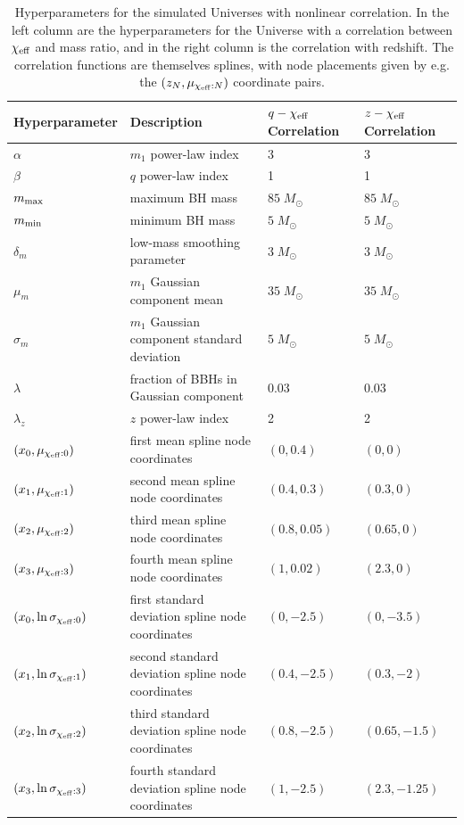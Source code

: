 \documentclass[%
 reprint,
 amsmath,amssymb,
 aps,
 prd,
]{revtex4-2}
\newcommand{\chieff}{\chi_{\rm eff}}
\newcommand{\Msun}{\;M_\odot}
\begin{document}
\renewcommand{\arraystretch}{1.25}
\begin{table}
    \centering
    \begin{tabular}{|l||lll|}
       \hline Hyperparameter & Description & $q-\chieff$ Correlation & $z-\chieff$ Correlation \\
       \hline $\alpha$ & $m_1$ power-law index & $3$ & $3$ \\
       $\beta$ & $q$ power-law index & 1 & 1 \\
       $m_{\rm max}$ & maximum BH mass & $85\Msun$ & $85 \Msun$ \\
       $m_{\rm min}$ & minimum BH mass & $5\Msun$ & $5 \Msun$ \\
       $\delta_m$ & low-mass smoothing parameter & $3\Msun$ & $3\Msun$ \\
       $\mu_{m}$ & $m_1$ Gaussian component mean & $35\Msun$ & $35 \Msun$ \\
       $\sigma_{m}$ & $m_1$ Gaussian component standard deviation  & $5\Msun$ & $5\Msun$ \\
       $\lambda$ & fraction of BBHs in Gaussian component & $0.03$ & $0.03$ \\
       $\lambda_z$ & $z$ power-law index & 2 & 2 \\ \hline
       $(x_0, \mu_{\chieff:0})$ & first mean spline node coordinates & $(0, 0.4)$ & $(0, 0)$ \\
       $(x_1, \mu_{\chieff:1})$ & second mean spline node coordinates & $(0.4, 0.3)$ & $(0.3, 0)$ \\
       $(x_2, \mu_{\chieff:2})$ & third mean spline node coordinates & $(0.8, 0.05)$ & $(0.65, 0)$ \\
       $(x_3, \mu_{\chieff:3})$ & fourth mean spline node coordinates & $(1, 0.02)$ & $(2.3, 0)$ \\
       $(x_0, \ln\sigma_{\chieff:0})$ & first standard deviation spline node coordinates & $(0, -2.5)$ & $(0, -3.5)$ \\
       $(x_1, \ln\sigma_{\chieff:1})$ & second standard deviation spline node coordinates & $(0.4, -2.5)$ & $(0.3, -2)$ \\
       $(x_2, \ln\sigma_{\chieff:2})$ & third standard deviation spline node coordinates & $(0.8, -2.5)$ & $(0.65, -1.5)$ \\
       $(x_3, \ln\sigma_{\chieff:3})$ & fourth standard deviation spline node coordinates & $(1, -2.5)$ & $(2.3, -1.25)$ \\ \hline
    \end{tabular}
    \caption{Hyperparameters for the simulated Universes with nonlinear correlation. In the left column are the hyperparameters for the Universe with a correlation between $\chieff$ and mass ratio, and in the right column is the correlation with redshift. The correlation functions are themselves splines, with node placements given by e.g. the $(z_N, \mu_{\chieff:N})$ coordinate pairs.}
    \label{tab:true_hyper}
\end{table}
\end{document}
